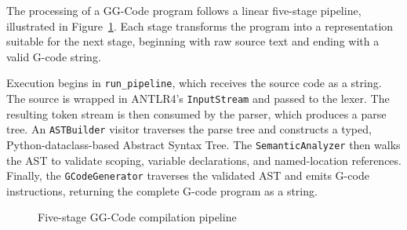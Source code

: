 The processing of a GG-Code program follows a linear five-stage pipeline, illustrated in Figure~\ref{fig:impl_pipeline}. Each stage transforms the program into a representation suitable for the next stage, beginning with raw source text and ending with a valid G-code string.

Execution begins in \texttt{run\_pipeline}, which receives the source code as a string. The source is wrapped in ANTLR4's \texttt{InputStream} and passed to the lexer. The resulting token stream is then consumed by the parser, which produces a parse tree. An \texttt{ASTBuilder} visitor traverses the parse tree and constructs a typed, Python-dataclass-based Abstract Syntax Tree. The \texttt{SemanticAnalyzer} then walks the AST to validate scoping, variable declarations, and named-location references. Finally, the \texttt{GCodeGenerator} traverses the validated AST and emits G-code instructions, returning the complete G-code program as a string.

\begin{figure}[H]
\centering
{}
\caption{Five-stage GG-Code compilation pipeline}
\label{fig:impl_pipeline}
\end{figure}

